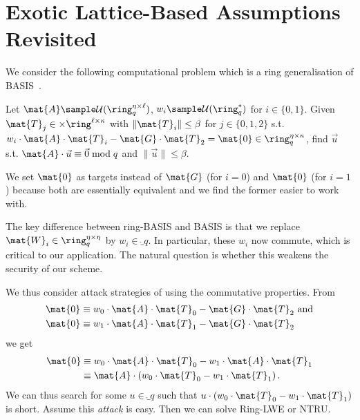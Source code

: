 	\section{Exotic Lattice-Based Assumptions Revisited}\label{sec:lattice-assumptions}
	
We consider the following computational problem which is a ring generalisation of BASIS~\cite{EPRINT:WeeWu22}.

\begin{definition}\label{def:ring-basis}
Let \(\mat{A}  \sample \mathcal{U}(\ring_{q}^{\eta \times \ell})\), \(w_{i} \sample \mathcal{U}(\ring_q^*)\) for \(i \in \{0,1\}\). Given \(\mat{T}_{j} \in \times \ring^{\ell \times \kappa}\) with \(\|\mat{T}_{i}\| \leq \beta\) for \(j \in \{0,1,2\}\) s.t. \(w_{i} \cdot \mat{A} \cdot \mat{T}_{i} - \mat{G} \cdot \mat{T}_{2} = \mat{0} \in \ring_{q}^{\eta \times \kappa}\), find
\(\vec{u}\) s.t. \(\mat{A} \cdot \vec{u} \equiv \vec{0} \bmod q\) and \(\|\vec{u}\| \leq \beta\).

\end{definition}

\begin{remark}
We set \(\mat{0}\) as targets instead of \(\mat{G}\) (for \(i=0\)) and \(\mat{0}\) (for \(i=1\)) because both are essentially equivalent and we find the former easier to work with.
\end{remark}

The key difference between ring-BASIS and BASIS is that we replace \(\mat{W}_{i} \in \ring_{q}^{\eta \times \eta}\) by \(w_{i} \in \ring_{q}\). In particular, these \(w_{i}\) now commute, which is critical to our application. The natural question is whether this weakens the security of our scheme.

We thus consider  attack strategies of using the commutative properties. From
\begin{align*}
\mat{0} & \equiv w_{0} \cdot \mat{A} \cdot \mat{T}_{0} - \mat{G} \cdot \mat{T}_{2} \text{ and}\\
\mat{0} & \equiv w_{1} \cdot \mat{A} \cdot \mat{T}_{1} - \mat{G} \cdot \mat{T}_{2}
\end{align*}
we get
\begin{align*}
\mat{0} & \equiv w_{0} \cdot \mat{A} \cdot \mat{T}_{0} -  w_{1} \cdot \mat{A} \cdot \mat{T}_{1}\\
        & \equiv \mat{A} \cdot \left(w_{0} \cdot \mat{T}_{0} -  w_{1} \cdot \mat{T}_{1} \right).
\end{align*}
We can thus search for some \(u \in \ring_{q}\) such that \(u \cdot (w_{0} \cdot \mat{T}_{0} -  w_{1} \cdot \mat{T}_{1})\) is short. Assume this \emph{attack} is easy. Then we can solve Ring-LWE or NTRU\@.

